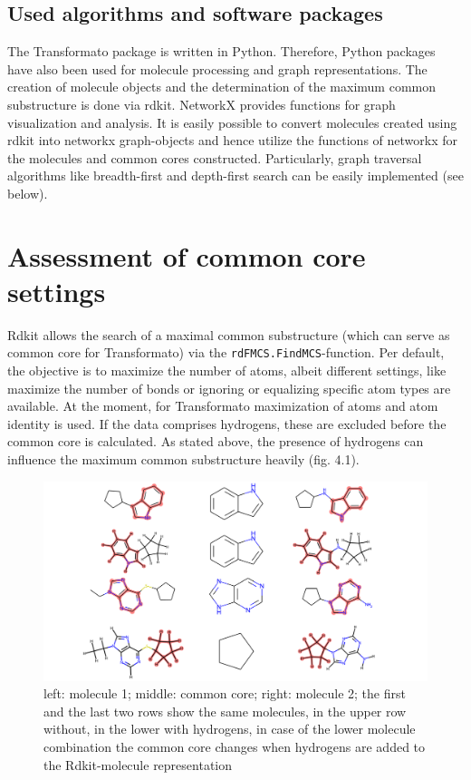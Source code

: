\subsection{Used algorithms and software packages}

The Transformato package is written in Python. Therefore, Python packages
have also been used for molecule processing and graph representations.
The creation of molecule objects and the determination of the maximum
common substructure is done via rdkit\cite{key-3}. NetworkX\cite{AricA.Hagberg.2008}
provides functions for graph visualization and analysis. It is easily
possible to convert molecules created using rdkit into networkx graph-objects
and hence utilize the functions of networkx for the molecules and
common cores constructed. Particularly, graph traversal algorithms
like breadth-first and depth-first search can be easily implemented
(see below).

\section{Assessment of common core settings}

Rdkit allows the search of a maximal common substructure (which can
serve as common core for Transformato) via the \texttt{rdFMCS.FindMCS}-function.
Per default, the objective is to maximize the number of atoms, albeit
different settings, like maximize the number of bonds or ignoring
or equalizing specific atom types are available. At the moment, for
Transformato maximization of atoms and atom identity is used. If the
data comprises hydrogens, these are excluded before the common core
is calculated. As stated above, the presence of hydrogens can influence
the maximum common substructure heavily (fig. 4.1).

\begin{figure}

\includegraphics[scale=0.3]{hydrogens_plus_minus}\caption{left: molecule 1; middle: common core; right: molecule 2; the first
and the last two rows show the same molecules, in the upper row without,
in the lower with hydrogens, in case of the lower molecule combination
the common core changes when hydrogens are added to the Rdkit-molecule
representation }

\end{figure}

